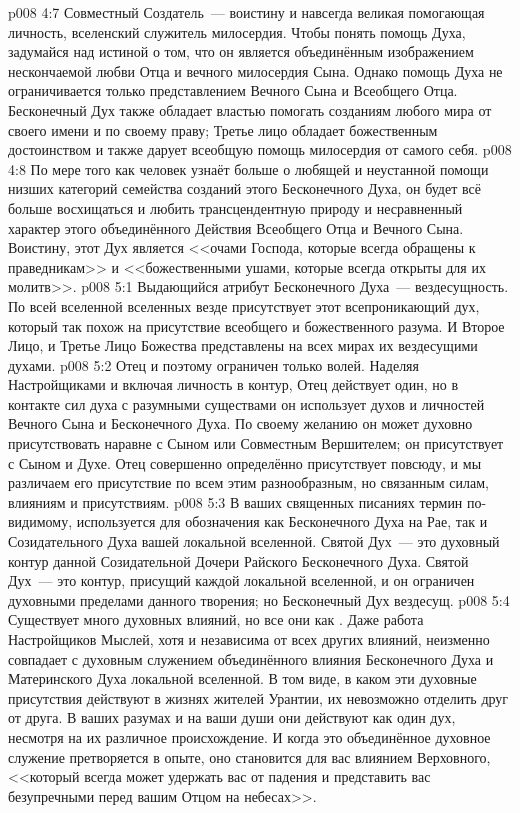 \vs p008 4:7 \pc Совместный Создатель~--- воистину и навсегда великая помогающая личность, вселенский служитель милосердия. Чтобы понять помощь Духа, задумайся над истиной о том, что он является объединённым изображением нескончаемой любви Отца и вечного милосердия Сына. Однако помощь Духа не ограничивается только представлением Вечного Сына и Всеобщего Отца. Бесконечный Дух также обладает властью помогать созданиям любого мира от своего имени и по своему праву; Третье лицо обладает божественным достоинством и также дарует всеобщую помощь милосердия от самого себя.
\vs p008 4:8 По мере того как человек узнаёт больше о любящей и неустанной помощи низших категорий семейства созданий этого Бесконечного Духа, он будет всё больше восхищаться и любить трансцендентную природу и несравненный характер этого объединённого Действия Всеобщего Отца и Вечного Сына. Воистину, этот Дух является <<очами Господа, которые всегда обращены к праведникам>> и <<божественными ушами, которые всегда открыты для их молитв>>.
\vs p008 5:1 Выдающийся атрибут Бесконечного Духа~--- вездесущность. По всей вселенной вселенных везде присутствует этот всепроникающий дух, который так похож на присутствие всеобщего и божественного разума. И Второе Лицо, и Третье Лицо Божества представлены на всех мирах их вездесущими духами.
\vs p008 5:2 Отец  и поэтому ограничен только волей. Наделяя Настройщиками и включая личность в контур, Отец действует один, но в контакте сил духа с разумными существами он использует духов и личностей Вечного Сына и Бесконечного Духа. По своему желанию он может духовно присутствовать наравне с Сыном или Совместным Вершителем; он присутствует  с Сыном и  Духе. Отец совершенно определённо присутствует повсюду, и мы различаем его присутствие по всем этим разнообразным, но связанным силам, влияниям и присутствиям.
\vs p008 5:3 \pc В ваших священных писаниях термин  по\hyp{}видимому, используется для обозначения как Бесконечного Духа на Рае, так и Созидательного Духа вашей локальной вселенной. Святой Дух~--- это духовный контур данной Созидательной Дочери Райского Бесконечного Духа. Святой Дух~--- это контур, присущий каждой локальной вселенной, и он ограничен духовными пределами данного творения; но Бесконечный Дух вездесущ.
\vs p008 5:4 \pc Существует много духовных влияний, но все они как . Даже работа Настройщиков Мыслей, хотя и независима от всех других влияний, неизменно совпадает с духовным служением объединённого влияния Бесконечного Духа и Материнского Духа локальной вселенной. В том виде, в каком эти духовные присутствия действуют в жизнях жителей Урантии, их невозможно отделить друг от друга. В ваших разумах и на ваши души они действуют как один дух, несмотря на их различное происхождение. И когда это объединённое духовное служение претворяется в опыте, оно становится для вас влиянием Верховного, <<который всегда может удержать вас от падения и представить вас безупречными перед вашим Отцом на небесах>>.
